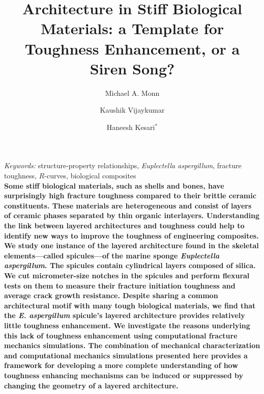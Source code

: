 \documentclass[12pt,onecolumn]{article}
\title{Architecture in Stiff Biological Materials: a Template for Toughness Enhancement, or a Siren Song?}
\author[1]{Michael A. Monn}
\author[1]{Kaushik Vijaykumar}
\author[1]{Haneesh Kesari$^*$}
\affil[1]{School of Engineering, Brown University, Providence, RI, USA}
\date{}
\begin{document}

\maketitle
\emph{Keywords:}
structure-property relationships, 
\textit{Euplectella aspergillum}, 
fracture toughness, 
$R$-curves, 
biological composites
\\
{
\singlespacing\small \bf
Some stiff biological materials, such as shells and bones, have surprisingly high fracture toughness compared to their brittle ceramic constituents. These materials are heterogeneous and consist of layers of ceramic phases separated by thin organic interlayers. Understanding the link between layered architectures and toughness could help to identify new ways to improve the toughness of engineering composites. We study one instance of the layered architecture found in the skeletal elements---called spicules---of the marine sponge \textit{Euplectella aspergillum}. The spicules contain cylindrical layers composed of silica. We cut micrometer-size notches in the spicules and perform flexural tests on them to measure their fracture initiation toughness and average crack growth resistance. Despite sharing a common architectural motif with many tough biological materials,  we find that the \textit{E. aspergillum} spicule's layered architecture provides relatively little toughness enhancement. We investigate the reasons underlying this lack of toughness enhancement using computational fracture mechanics simulations. The combination of mechanical characterization and computational mechanics simulations presented here provides a framework for developing a more complete understanding of how toughness enhancing mechanisms can be induced or suppressed by changing the geometry of a layered architecture.
}
\end{document}
